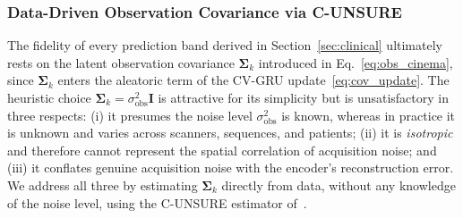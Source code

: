 \documentclass[10pt,twocolumn]{article}
\begin{document}
\subsubsection{Data-Driven Observation Covariance via C-UNSURE}
\label{sec:cunsure}

The fidelity of every prediction band derived in Section~\ref{sec:clinical} ultimately rests on the latent observation covariance $\bm{\Sigma}_k$ introduced in Eq.~\eqref{eq:obs_cinema}, since $\bm{\Sigma}_k$ enters the aleatoric term of the CV-GRU update~\eqref{eq:cov_update}. The heuristic choice $\bm{\Sigma}_k = \sigma^2_{\text{obs}}\bm{I}$ is attractive for its simplicity but is unsatisfactory in three respects: (i) it presumes the noise level $\sigma^2_{\text{obs}}$ is known, whereas in practice it is unknown and varies across scanners, sequences, and patients; (ii) it is \emph{isotropic} and therefore cannot represent the spatial correlation of acquisition noise; and (iii) it conflates genuine acquisition noise with the encoder's reconstruction error. We address all three by estimating $\bm{\Sigma}_k$ directly from data, without any knowledge of the noise level, using the C-UNSURE estimator of~\cite{tachella2025unsure}.
\end{document}

